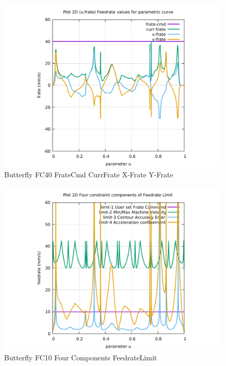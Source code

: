 \begin{figure}
	\caption     {Butterfly FC40 FrateCmd CurrFrate X-Frate Y-Frate}
	\label{30-img-Butterfly-FC40-FrateCmd-CurrFrate-X-Frate-Y-Frate.pdf}
\includegraphics[width=1.00\textwidth]{Chap4/appendix/app-Butterfly/plots/30-img-Butterfly-FC40-FrateCmd-CurrFrate-X-Frate-Y-Frate.pdf}
\end{figure}


\clearpage
\pagebreak

\begin{figure}
	\caption     {Butterfly FC10 Four Components FeedrateLimit}
	\label{31-img-Butterfly-FC10-Four-Components-FeedrateLimit.pdf}
	\includegraphics[width=1.00\textwidth]{Chap4/appendix/app-Butterfly/plots/31-img-Butterfly-FC10-Four-Components-FeedrateLimit.pdf}
\end{figure}


